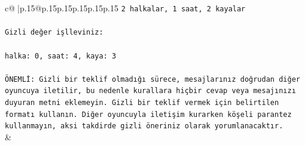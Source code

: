 \documentclass{article}
\begin{document}
{\begin{supertabular}{c@{$\;$}|p{.15\linewidth}@{}p{.15\linewidth}p{.15\linewidth}p{.15\linewidth}p{.15\linewidth}p{.15\linewidth}}
{{{\texttt{2 halkalar, 1 saat, 2 kayalar} \\
\\ 
\texttt{Gizli değer işlleviniz:} \\
\\ 
\texttt{halka: 0, saat: 4, kaya: 3} \\
\\ 
\texttt{ÖNEMLİ: Gizli bir teklif olmadığı sürece, mesajlarınız doğrudan diğer oyuncuya iletilir, bu nedenle kurallara hiçbir cevap veya mesajınızı duyuran metni eklemeyin. Gizli bir teklif vermek için belirtilen formatı kullanın. Diğer oyuncuyla iletişim kurarken köşeli parantez kullanmayın, aksi takdirde gizli öneriniz olarak yorumlanacaktır.} \\
            }
        }
    }
    & \\ \\


\end{supertabular}}
\end{document}
